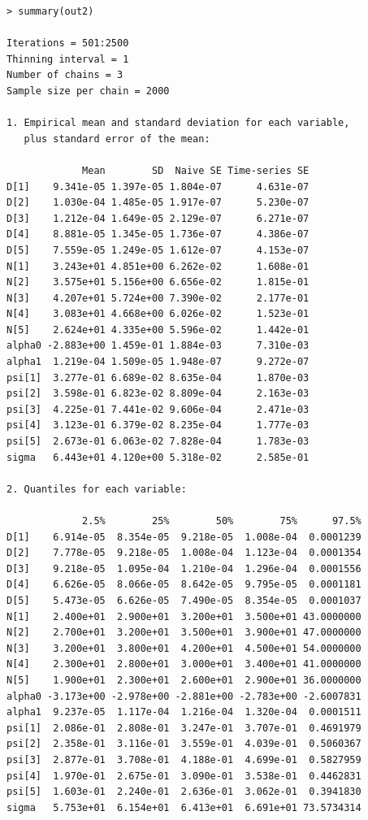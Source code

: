 \begin{verbatim}
> summary(out2)

Iterations = 501:2500
Thinning interval = 1
Number of chains = 3
Sample size per chain = 2000

1. Empirical mean and standard deviation for each variable,
   plus standard error of the mean:

             Mean        SD  Naive SE Time-series SE
D[1]    9.341e-05 1.397e-05 1.804e-07      4.631e-07
D[2]    1.030e-04 1.485e-05 1.917e-07      5.230e-07
D[3]    1.212e-04 1.649e-05 2.129e-07      6.271e-07
D[4]    8.881e-05 1.345e-05 1.736e-07      4.386e-07
D[5]    7.559e-05 1.249e-05 1.612e-07      4.153e-07
N[1]    3.243e+01 4.851e+00 6.262e-02      1.608e-01
N[2]    3.575e+01 5.156e+00 6.656e-02      1.815e-01
N[3]    4.207e+01 5.724e+00 7.390e-02      2.177e-01
N[4]    3.083e+01 4.668e+00 6.026e-02      1.523e-01
N[5]    2.624e+01 4.335e+00 5.596e-02      1.442e-01
alpha0 -2.883e+00 1.459e-01 1.884e-03      7.310e-03
alpha1  1.219e-04 1.509e-05 1.948e-07      9.272e-07
psi[1]  3.277e-01 6.689e-02 8.635e-04      1.870e-03
psi[2]  3.598e-01 6.823e-02 8.809e-04      2.163e-03
psi[3]  4.225e-01 7.441e-02 9.606e-04      2.471e-03
psi[4]  3.123e-01 6.379e-02 8.235e-04      1.777e-03
psi[5]  2.673e-01 6.063e-02 7.828e-04      1.783e-03
sigma   6.443e+01 4.120e+00 5.318e-02      2.585e-01

2. Quantiles for each variable:

             2.5%        25%        50%        75%      97.5%
D[1]    6.914e-05  8.354e-05  9.218e-05  1.008e-04  0.0001239
D[2]    7.778e-05  9.218e-05  1.008e-04  1.123e-04  0.0001354
D[3]    9.218e-05  1.095e-04  1.210e-04  1.296e-04  0.0001556
D[4]    6.626e-05  8.066e-05  8.642e-05  9.795e-05  0.0001181
D[5]    5.473e-05  6.626e-05  7.490e-05  8.354e-05  0.0001037
N[1]    2.400e+01  2.900e+01  3.200e+01  3.500e+01 43.0000000
N[2]    2.700e+01  3.200e+01  3.500e+01  3.900e+01 47.0000000
N[3]    3.200e+01  3.800e+01  4.200e+01  4.500e+01 54.0000000
N[4]    2.300e+01  2.800e+01  3.000e+01  3.400e+01 41.0000000
N[5]    1.900e+01  2.300e+01  2.600e+01  2.900e+01 36.0000000
alpha0 -3.173e+00 -2.978e+00 -2.881e+00 -2.783e+00 -2.6007831
alpha1  9.237e-05  1.117e-04  1.216e-04  1.320e-04  0.0001511
psi[1]  2.086e-01  2.808e-01  3.247e-01  3.707e-01  0.4691979
psi[2]  2.358e-01  3.116e-01  3.559e-01  4.039e-01  0.5060367
psi[3]  2.877e-01  3.708e-01  4.188e-01  4.699e-01  0.5827959
psi[4]  1.970e-01  2.675e-01  3.090e-01  3.538e-01  0.4462831
psi[5]  1.603e-01  2.240e-01  2.636e-01  3.062e-01  0.3941830
sigma   5.753e+01  6.154e+01  6.413e+01  6.691e+01 73.5734314
\end{verbatim}

